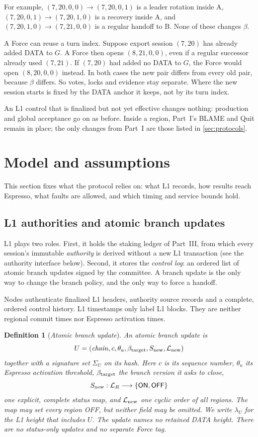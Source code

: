 \documentclass[11pt,a4paper]{article}
\newcommand{\tagg}[1]{\ensuremath{\mathsf{#1}}}
\newcommand{\defterm}[1]{\textcolor{rrBlue}{\textit{#1}}}
\newtheorem{definition}{Definition}[section]
\newcounter{protocol}
\begin{document}
For example, $(7,20,0,0)\to(7,20,0,1)$ is a leader rotation inside A,
$(7,20,0,1)\to(7,20,1,0)$ is a recovery inside A, and
$(7,20,1,0)\to(7,21,0,0)$ is a regular handoff to B. None of these
changes $\beta$.

A Force can reuse a turn index. Suppose export session $(7,20)$ has
already added DATA to $G$. A Force then opens $(8,21,0,0)$, even if
a regular successor already used $(7,21)$. If $(7,20)$ had added no
DATA to $G$, the Force would open $(8,20,0,0)$ instead. In both cases
the new pair differs from every old pair, because $\beta$ differs. So
votes, locks and evidence stay separate. Where the new session starts is
fixed by the DATA anchor it keeps, not by its turn index.

An L1 control that is finalized but not yet effective changes nothing:
production and global acceptance go on as before. Inside a region,
Part~I's BLAME and Quit remain in place; the only changes from Part~I
are those listed in \cref{sec:protocols}.


\section{Model and assumptions}
\label{sec:model}
This section fixes what the protocol relies on: what L1 records, how
results reach Espresso, what faults are allowed, and which timing and
service bounds hold.

\subsection{L1 authorities and atomic branch updates}
\label{sec:l1}
\label{sec:runtime-controls}
L1 plays two roles. First, it holds the staking ledger of Part~III,
from which every session's immutable \emph{authority} is derived without
a new L1 transaction (see the authority interface below). Second, it stores
the \emph{control log}: an ordered list of atomic branch updates signed
by the committee. A branch update is the only way to change the branch
policy, and the only way to force a handoff.

Nodes authenticate finalized L1 headers, authority source records and a
complete, ordered control history. L1 timestamps only label L1 blocks. They are
neither regional commit times nor Espresso activation times.

\begin{definition}[\defterm{Atomic branch update}]
\label{def:control-update}
An atomic branch update is
\[
 U=(\mathit{chain},c,\theta_a,\beta_{\rm target},S_{\rm new},
    \mathcal L_{\rm new})
\]
together with a signature set $\Sigma_U$ on its hash. Here $c$ is its
sequence number, $\theta_a$ its Espresso activation threshold,
$\beta_{\rm target}$ the branch version it asks to close,
\[
 S_{\rm new}:\mathcal L_R\longrightarrow
 \{\tagg{ON},\tagg{OFF}\}
\]
one explicit, complete status map, and $\mathcal L_{\rm new}$ one cyclic
order of all regions. The map may set every region OFF, but neither field
may be omitted. We write $\lambda_U$ for the L1 height that includes $U$.
The update names no retained DATA height. There are no status-only updates
and no separate Force tag.
\end{definition}
\end{document}
